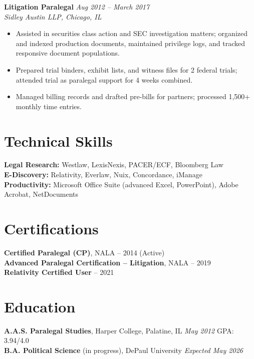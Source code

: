 \documentclass[11pt,a4paper]{article}
\begin{document}
\vspace{4pt}
\noindent\textbf{Litigation Paralegal} \hfill \textit{Aug 2012 -- March 2017}\\
\textit{Sidley Austin LLP, Chicago, IL}
\begin{itemize}
  \item Assisted in securities class action and SEC investigation matters; organized and indexed production documents, maintained privilege logs, and tracked responsive document populations.
  \item Prepared trial binders, exhibit lists, and witness files for 2 federal trials; attended trial as paralegal support for 4 weeks combined.
  \item Managed billing records and drafted pre-bills for partners; processed 1,500+ monthly time entries.
\end{itemize}

\section{Technical Skills}
\textbf{Legal Research:} Westlaw, LexisNexis, PACER/ECF, Bloomberg Law\\
\textbf{E-Discovery:} Relativity, Everlaw, Nuix, Concordance, iManage\\
\textbf{Productivity:} Microsoft Office Suite (advanced Excel, PowerPoint), Adobe Acrobat, NetDocuments

\section{Certifications}
\textbf{Certified Paralegal (CP)}, NALA -- 2014 (Active)\\
\textbf{Advanced Paralegal Certification -- Litigation}, NALA -- 2019\\
\textbf{Relativity Certified User} -- 2021

\section{Education}
\textbf{A.A.S. Paralegal Studies}, Harper College, Palatine, IL \hfill \textit{May 2012} \quad GPA: 3.94/4.0\\
\textbf{B.A. Political Science} (in progress), DePaul University \hfill \textit{Expected May 2026}
\end{document}
